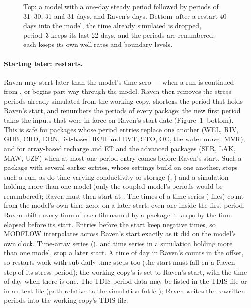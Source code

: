 \begin{figure}[!htbp]\centering
\caption{Top: a model with a one-day steady period followed by periods of 31, 30, 31 and 31 days, and Raven's days. Bottom: after a restart 40 days into the model, the time already simulated is dropped, period~3 keeps its last 22 days, and the periods are renumbered; each keeps its own well rates and boundary levels.}\label{fig:periods}
\end{figure}

\paragraph{Starting later: restarts.} Raven may start later than the model's time zero --- when a run is continued from
, or begins part-way through the model. Raven then removes the stress periods already simulated from the
working copy, shortens the period that holds Raven's start, and renumbers the periods of every package; the new first period
takes the inputs that were in force on Raven's start date (Figure~\ref{fig:periods}, bottom). This is safe for packages whose period
entries replace one another (WEL, RIV, GHB, CHD, DRN, list-based RCH and EVT, STO, OC, the water mover MVR), and for
array-based recharge and ET and the advanced packages (SFR, LAK, MAW, UZF) when at most one period entry comes before Raven's
start. Such a package with several earlier entries, whose settings build on one another, stops such a run, as do time-varying conductivity or storage
(, ) and a simulation holding more than one model (only the coupled model's periods would be
renumbered); Raven must then start at . The times of a time series ( files) count from the
model's own time zero: on a later start, even one inside the first period, Raven shifts every time of each  file
named by a package it keeps by the time elapsed before its start. Entries before the start keep negative times,
so MODFLOW interpolates across Raven's start exactly as it did on the model's own clock. Time-array series (), and
time series in a simulation holding more than one model, stop a later start. A time of day in Raven's 
counts in the offset, so restarts work with sub-daily time steps too (the start must fall on a Raven step of its stress
period); the working copy's  is set to Raven's start, with the time of day when there is one.
The TDIS period data may be listed in the TDIS file or in an  text file (path relative to the simulation
folder); Raven writes the rewritten periods into the working copy's TDIS file.

